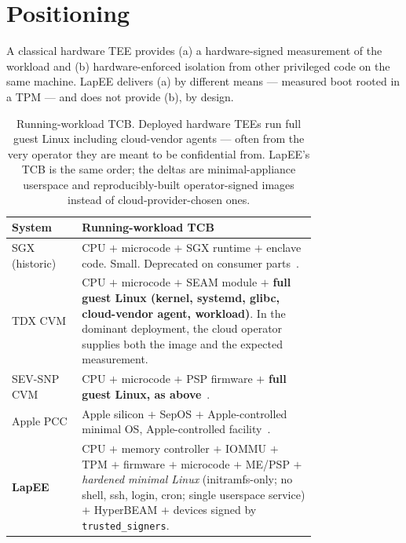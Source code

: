 \documentclass[10pt,a4paper]{article}
\begin{document}
\vspace{-0.3em}
\section{Positioning}
\label{sec:positioning}
\vspace{-0.3em}

A classical hardware TEE provides (a) a hardware-signed measurement of the
workload and (b) hardware-enforced isolation from other privileged code on
the same machine. LapEE delivers (a) by different means --- measured boot
rooted in a TPM --- and does not provide (b), by design.

\begin{table}[ht]
\centering
\footnotesize
\begin{tabular}{@{}l p{0.77\linewidth}@{}}
\toprule
\textbf{System} & \textbf{Running-workload TCB} \\
\midrule
SGX (historic) & CPU $+$ microcode $+$ SGX runtime $+$ enclave code. Small. Deprecated on consumer parts~\cite{costan-sgx,foreshadow}. \\
TDX CVM        & CPU $+$ microcode $+$ SEAM module $+$ \textbf{full guest Linux (kernel, systemd, glibc, cloud-vendor agent, workload)}. In the dominant deployment, the cloud operator supplies both the image and the expected measurement. \\
SEV-SNP CVM    & CPU $+$ microcode $+$ PSP firmware $+$ \textbf{full guest Linux, as above}~\cite{cipherleaks}. \\
Apple PCC      & Apple silicon $+$ SepOS $+$ Apple-controlled minimal OS, Apple-controlled facility~\cite{apple-pcc}. \\
\textbf{LapEE} & CPU $+$ memory controller $+$ IOMMU $+$ TPM $+$ firmware $+$ microcode $+$ ME/PSP $+$ \emph{hardened minimal Linux} (initramfs-only; no shell, ssh, login, cron; single userspace service) $+$ HyperBEAM $+$ devices signed by \texttt{trusted\_signers}. \\
\bottomrule
\end{tabular}
\vspace{-0.3em}
\caption{Running-workload TCB. Deployed hardware TEEs run full guest Linux
including cloud-vendor agents --- often from the very operator they are
meant to be confidential from. LapEE's TCB is the same order; the deltas
are minimal-appliance userspace and reproducibly-built operator-signed
images instead of cloud-provider-chosen ones.}
\label{tab:tcb}
\end{table}
\end{document}
